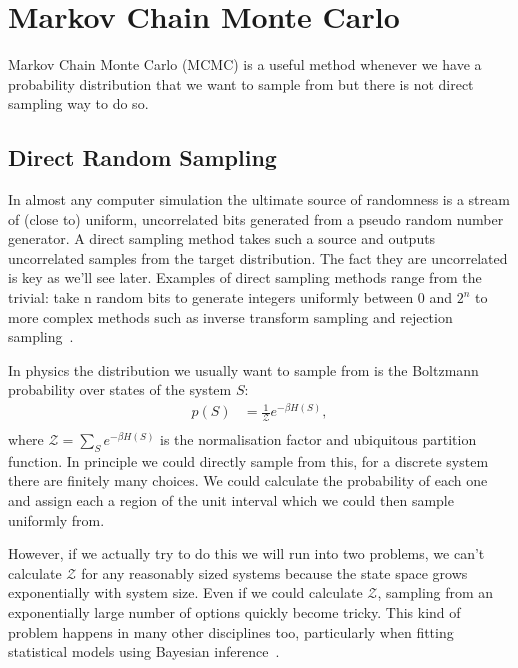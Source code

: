 \hypertarget{markov-chain-monte-carlo}{%
\section{Markov Chain Monte Carlo}\label{markov-chain-monte-carlo}}

Markov Chain Monte Carlo (MCMC) is a useful method whenever we have a probability distribution that we want to sample from but there is not direct sampling way to do so.

\hypertarget{direct-random-sampling}{%
\subsection{Direct Random Sampling}\label{direct-random-sampling}}

In almost any computer simulation the ultimate source of randomness is a stream of (close to) uniform, uncorrelated bits generated from a pseudo random number generator. A direct sampling method takes such a source and outputs uncorrelated samples from the target distribution. The fact they are uncorrelated is key as we'll see later. Examples of direct sampling methods range from the trivial: take n random bits to generate integers uniformly between 0 and \(2^n\) to more complex methods such as inverse transform sampling and rejection sampling~\autocite{devroyeRandomSampling1986}.

In physics the distribution we usually want to sample from is the Boltzmann probability over states of the system \(S\): \[
\begin{aligned}
p(S)  &= \frac{1}{\mathcal{Z}} e^{-\beta H(S)}, \\
\end{aligned}
\] where \(\mathcal{Z} = \sum_S e^{-\beta H(S)}\) is the normalisation factor and ubiquitous partition function. In principle we could directly sample from this, for a discrete system there are finitely many choices. We could calculate the probability of each one and assign each a region of the unit interval which we could then sample uniformly from.

However, if we actually try to do this we will run into two problems, we can't calculate \(\mathcal{Z}\) for any reasonably sized systems because the state space grows exponentially with system size. Even if we could calculate \(\mathcal{Z}\), sampling from an exponentially large number of options quickly become tricky. This kind of problem happens in many other disciplines too, particularly when fitting statistical models using Bayesian inference~\autocite{BMCP2021}.

